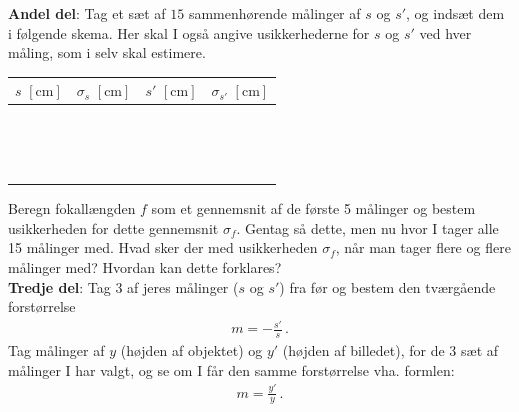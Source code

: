 \documentclass[a4paper,oneside,article,11pt]{memoir}
\begin{document}
\textbf{Andel del}:
Tag et sæt af $15$ sammenhørende målinger af $s$ og $s'$, og indsæt dem i følgende skema. Her skal I også angive usikkerhederne for $s$ og $s'$ ved hver måling, som i selv skal estimere. 
\begin{table}[h!]
	\centering
	 \renewcommand*{\arraystretch}{1.3}
	\begin{tabular}{|l|l|l|l|}
		\hline
	$s \, \, \left[ \text{cm} \right]$	& $\sigma_s \, \, \left[ \text{cm} \right]$ & $s' \, \, \left[ \text{cm} \right]$ & $\sigma_{s'} \, \, \left[ \text{cm} \right]$  \\ \hline
		&  &  &  \\ \hline
		&  &  &  \\ \hline
		&  &  &  \\ \hline
		&  &  &  \\ \hline
		&  &  &  \\ \hline
		&  &  &  \\ \hline
		&  &  &  \\ \hline
		&  &  &  \\ \hline
		&  &  &  \\ \hline
		&  &  &  \\ \hline
		&  &  &  \\ \hline
		&  &  &  \\ \hline
		&  &  &  \\ \hline
		&  &  &  \\ \hline
		&  &  &  \\ \hline
	\end{tabular}
\end{table}

Beregn fokallængden $f$ som et gennemsnit af de første 5 målinger og bestem usikkerheden for dette gennemsnit $\sigma_f$. Gentag så dette, men nu hvor I tager alle 15 målinger med. Hvad sker der med usikkerheden $\sigma_f$, når man tager flere og flere målinger med? Hvordan kan dette forklares?\\

\textbf{Tredje del}:
Tag 3 af jeres målinger ($s$ og $s'$) fra før og bestem den tværgående forstørrelse
\begin{align*}
m = - \frac{s'}{s} \, .
\end{align*}
Tag målinger af $y$ (højden af objektet) og $y'$ (højden af billedet), for de 3 sæt af målinger I har valgt, og se om I får den samme forstørrelse vha. formlen:
\begin{align*}
m = \frac{y'}{y} \, .
\end{align*}
\end{document}
